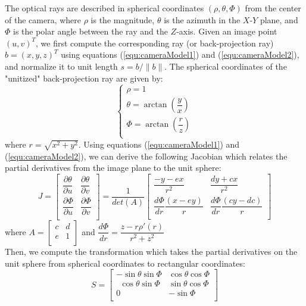 The optical rays are described in spherical coordinates $(\rho, \theta, \Phi)$ from the center of the camera, where $\rho$ is the magnitude, $\theta$ is the azimuth in the $X$-$Y$ plane, and $\Phi$ is the polar angle between the ray and the $Z$-axis. Given an image point $(u,v)^T$, we first compute the corresponding ray (or back-projection ray) $b=(x, y, z)^T$ using equations (\ref{equ:cameraModel1}) and (\ref{equ:cameraModel2}), and normalize it to unit length $s = b/\|b\|$. The spherical coordinates of the "unitized" back-projection ray are given by:
\begin{equation}
\begin{cases}
\rho = 1\\[6pt]
\theta = \arctan(\dfrac{y}{x})\\[6pt]
\Phi = \arctan(\dfrac{r}{z})\\[6pt]
\end{cases}
\end{equation}
where $r = \sqrt{x^2+y^2}$. Using equations (\ref{equ:cameraModel1}) and (\ref{equ:cameraModel2}), we can derive the following Jacobian which relates the partial derivatives from the image plane to the unit sphere:
\begin{equation}
J =
\begin{bmatrix}
\dfrac{\partial\theta}{\partial u} & \dfrac{\partial\theta}{\partial v}\\[8pt]
\dfrac{\partial\Phi}{\partial u}	  & \dfrac{\partial\Phi}{\partial v}\\
\end{bmatrix}
=\dfrac{1}{det(A)}
\begin{bmatrix}
\dfrac{-y - ex}{r^2} & \dfrac{dy + cx}{r^2}\\[8pt]
\dfrac{d\Phi}{dr}\dfrac{(x-ey)}{r} & \dfrac{d\Phi}{dr}\dfrac{(cy - dc)}{r}\\
\end{bmatrix}
\end{equation}
where 
$
A = \begin{bmatrix}
c & d\\
e & 1\\
\end{bmatrix}
$
and 
$ \dfrac{d\Phi}{dr} = \dfrac{z - r\rho'(r)}{r^2 + z^2}$\\
Then, we compute the transformation which takes the partial derivatives on the unit sphere from spherical coordinates to rectangular coordinates:
\begin{equation}
S =
\begin{bmatrix}
-\sin\theta \sin\Phi & \cos\theta \cos\Phi\\
~~\cos\theta \sin\Phi & \sin\theta \cos\Phi\\
0 & -\sin\Phi\\
\end{bmatrix}
\end{equation}

